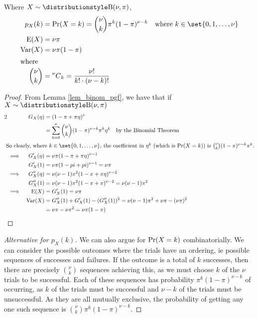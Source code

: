 \begin{theorem}
Where \(X \sim \Binomial(\nu, \pi)\),
\begin{align*}
p_X(k) &= \Prob(X = k) = \binom \nu k \pi^k (1 - \pi)^{\nu - k}
    \quad \text{where \(k \in \set{0, 1, \dotsc, \nu}\)} \\
\Expect(X) &= \nu \pi \\
\Var(X) &= \nu \pi (1 - \pi) \\
\intertext{where}
\binom \nu k &= \nCr \nu k = \frac{\nu!}{k!\cdot (\nu - k)!}
\end{align*}
\end{theorem}
\begin{proof}
From Lemma \ref{lem_binom_pgf}, we have that if \(X \sim \Binomial(\nu, \pi)\)
\begin{alignat*} 2
&& G_X(\eta) &= (1 - \pi + \pi \eta)^\nu \\
&&           &= \sum_{k = 0}^\nu
                \binom \nu k (1 - \pi)^{\nu - k} \pi^k \eta^k
                    \quad \text{by the Binomial Theorem} \\
\intertext{
So clearly, where \(k \in \set{0, 1, \dotsc, \nu}\), the coefficient in
\(\eta^k\) (which is \(\Prob(X = k)\)) is
\(\binom \nu k (1 - \pi)^{\nu - k} \pi^k\).}
&\implies& G_X'(\eta) &= \nu \pi (1 - \pi + \pi \eta)^{\nu - 1} \\
&& G_X'(1) &= \nu \pi (1 - pi + pi)^{\nu - 1} = \nu \pi \\
&\implies& G_X''(\eta) &= \nu(\nu - 1) \pi^2 (1 - \pi + \pi \eta)^{\nu - 2} \\
&& G_X''(1) &= \nu(\nu - 1)\pi^2(1 - \pi + \pi)^{\nu - 2} = \nu(\nu - 1)\pi^2 \\
&\implies& \Expect(X) &= G_X'(1) = \nu \pi \\
&& \Var(X) &= G_X''(1) + G_X'(1) - (G_X''(1))^2
    = \nu(\nu - 1) \pi^2 + \nu \pi - (\nu \pi)^2 \\
&& &= \nu \pi - \nu \pi^2 = \nu \pi (1 - \pi) \qedhere
\end{alignat*}
\end{proof}
\begin{proof}[Alternative for \(p_X(k)\)]
We can also argue for \(\operatorname{Pr}(X = k)\) combinatorially. We can consider the
possible outcomes where the trials have an ordering, ie possible sequences
of successes and failures. If the outcome is a total of \(k\) successes, then
there are precisely \(\binom \nu k\) sequences achieving this, as we must choose
\(k\) of the \(\nu\) trials to be successful. Each of these sequences has
probability \(\pi^k (1 - \pi)^{\nu - k}\) of occurring, as \(k\) of the trials
must be successful and \(\nu - k\) of the trials must be unsuccessful. As they
are all mutually exclusive, the probability of getting any one such sequence is
\(\binom \nu k \pi^k (1 - \pi)^{\nu - k}\).
\end{proof}

